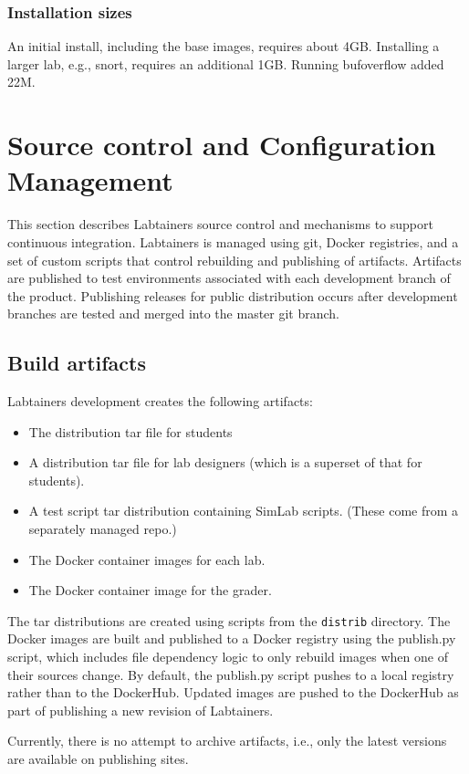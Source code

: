 \documentclass[12pt]{article}
\begin{document}
\subsubsection {Installation sizes}
An initial install, including the base images, requires about 4GB.  Installing a larger lab,
e.g., snort, requires an additional 1GB.  Running bufoverflow added 22M.

\section {Source control and Configuration Management}
\label{releases}
This section describes Labtainers source control and mechanisms to support continuous
integration.  Labtainers is managed using git, Docker registries, and a set of custom scripts that control
rebuilding and publishing of artifacts.  Artifacts are published to test environments associated with each
development branch of the product.  Publishing releases for public distribution occurs after development
branches are tested and merged into the master git branch.

\subsection{Build artifacts}
Labtainers development creates the following artifacts:
\begin{itemize}
\item The distribution tar file for students
\item A distribution tar file for lab designers (which is a superset of that for students).
\item A test script tar distribution containing SimLab scripts. (These come from a separately managed repo.)
\item The Docker container images for each lab.
\item The Docker container image for the grader.
\end{itemize}

The tar distributions are created using scripts from the {\tt distrib} directory.  The Docker images are built and published to
a Docker registry using the publish.py script, which includes file dependency logic to only rebuild images when one
of their sources change.  By default, the publish.py script pushes to a local registry rather than to the DockerHub.  
Updated images are pushed to the DockerHub as part of publishing a new revision of Labtainers.

Currently, there is no attempt to archive artifacts, i.e., only the latest versions are available on publishing sites.
\end{document}
